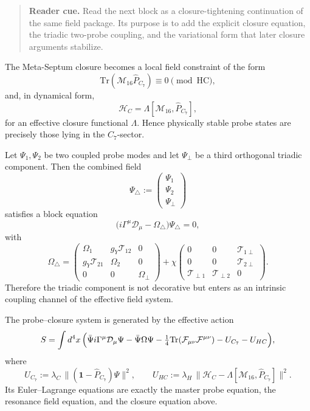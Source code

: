 \begin{quote}\small
\noindent\textbf{Reader cue.} Read the next block as a closure-tightening continuation of the same field package. Its purpose is to add the explicit closure equation, the triadic two-probe coupling, and the variational form that later closure arguments stabilize.
\end{quote}

\begin{proposition}
\label{prop:closure-equation}
The Meta-Septum closure becomes a local field constraint of the form
\[
 \mathrm{Tr}(\mathcal M_{16}\hat P_{C_7})
 \equiv 0 \pmod{\mathrm{HC}},
\]
and, in dynamical form,
\[
 \mathcal H_C = \Lambda[\mathcal M_{16},\hat P_{C_7}],
\]
for an effective closure functional $\Lambda$.
Hence physically stable probe states are precisely those lying in the
$C_7$-sector.
\end{proposition}

\begin{proposition}
\label{prop:triadic-two-probe}
Let $\Psi_1,\Psi_2$ be two coupled probe modes and let $\Psi_\perp$ be a
third orthogonal triadic component.
Then the combined field
\[
 \Psi_{\triangle}
 :=
 \begin{pmatrix}
 \Psi_1\\
 \Psi_2\\
 \Psi_\perp
 \end{pmatrix}
\]
satisfies a block equation
\[
 \bigl(i\Gamma^\mu\mathcal D_\mu - \Omega_{\triangle}\bigr)
 \Psi_{\triangle}=0,
\]
with
\[
 \Omega_{\triangle}
 =
 \begin{pmatrix}
 \Omega_1 & g_Y\mathcal T_{12} & 0\\
 g_Y\mathcal T_{21} & \Omega_2 & 0\\
 0 & 0 & \Omega_\perp
 \end{pmatrix}
 +
 \chi
 \begin{pmatrix}
 0 & 0 & \mathcal T_{1\perp}\\
 0 & 0 & \mathcal T_{2\perp}\\
 \mathcal T_{\perp1} & \mathcal T_{\perp2} & 0
 \end{pmatrix}.
\]
Therefore the triadic component is not decorative but enters as an
intrinsic coupling channel of the effective field system.
\end{proposition}

\begin{theorem}
\label{thm:variational-form}
The probe--closure system is generated by the effective action
\[
 S
 =
 \int d^4x\,
 \Bigl(
 \bar\Psi i\Gamma^\mu\mathcal D_\mu\Psi
 - \bar\Psi\Omega\Psi
 - \tfrac14\mathrm{Tr}(\mathcal F_{\mu\nu}\mathcal F^{\mu\nu})
 - U_{C_7}
 - U_{HC}
 \Bigr),
\]
where
\[
 U_{C_7}
 :=
 \lambda_C\,
 \bigl\|(\mathbf 1-\hat P_{C_7})\Psi\bigr\|^2,
 \qquad
 U_{HC}
 :=
 \lambda_H\,
 \bigl\|\mathcal H_C - \Lambda[\mathcal M_{16},\hat P_{C_7}]\bigr\|^2.
\]
Its Euler--Lagrange equations are exactly the master probe equation,
the resonance field equation, and the closure equation above.
\end{theorem}

